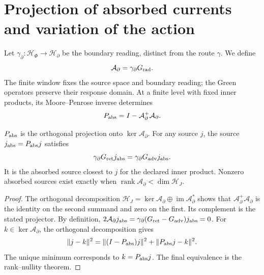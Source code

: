 \section{Projection of absorbed currents and variation of the action}
\label{x_reciprocidad:vii:subsec:proyeccion-absorcion}

Let \(\gamma_\partial:\mathcal H_\Phi\to\mathcal H_\partial\)
be the boundary reading, distinct from the route \(\gamma\). We define
\[
 \mathcal A_\partial=\gamma_\partial G_{\rm rad}.
\]
The finite window fixes the source space and boundary reading;
the Green operators preserve their response domain. At a finite level with
fixed inner products, its Moore--Penrose
inverse determines
\begin{equation}
 P_{\rm abs}=I-\mathcal A_\partial^+\mathcal A_\partial.
 \label{x_reciprocidad:vii:eq:proyector-absorcion}
\end{equation}

\begin{theorem}
\label{x_reciprocidad:vii:thm:proyeccion-absorcion}
\(P_{\rm abs}\) is the orthogonal projection onto
\(\ker\mathcal A_\partial\). For any source \(j\), the source
\(j_{\rm abs}=P_{\rm abs}j\) satisfies
\begin{equation}
 \gamma_\partial G_{\rm ret}j_{\rm abs}
 =\gamma_\partial G_{\rm adv}j_{\rm abs}.
 \label{x_reciprocidad:vii:eq:igualdad-borde-absorbido}
\end{equation}
It is the absorbed source closest to \(j\) for the declared inner
product. Nonzero absorbed sources exist exactly when
\(\operatorname{rank}\mathcal A_\partial<\dim\mathcal H_J\).
\end{theorem}
\begin{proof}
The orthogonal decomposition
\(\mathcal H_J=\ker\mathcal A_\partial\oplus
 \operatorname{im}\mathcal A_\partial^*\) shows that
\(\mathcal A_\partial^+\mathcal A_\partial\) is the identity
on the second summand and zero on the first. Its complement is the
stated projector. By definition,
\(2\mathcal A_\partial j_{\rm abs}
 =\gamma_\partial(G_{\rm ret}-G_{\rm adv})j_{\rm abs}=0\).
For \(k\in\ker\mathcal A_\partial\), the orthogonal decomposition gives
\[
 \|j-k\|^2=\|(I-P_{\rm abs})j\|^2+\|P_{\rm abs}j-k\|^2.
\]
The unique minimum corresponds to \(k=P_{\rm abs}j\).
The final equivalence is the rank--nullity theorem.
\end{proof}

